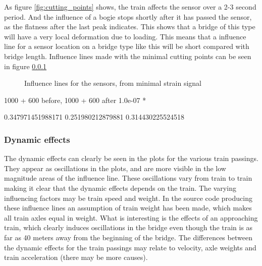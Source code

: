 As figure \ref{fig:cutting_points} shows, the train affects the sensor over a 2-3 second period. And the influence of a bogie stops shortly after it has passed the sensor, as the flatness after the last peak indicates. This shows that a bridge of this type will have a very local deformation due to loading. This means that a influence line for a sensor location on a bridge type like this will be short compared with bridge length. Influence lines made with the minimal cutting points can be seen in figure \ref{}

\begin{figure}[H]
	\begin{adjustbox}{center}
		
	\end{adjustbox}
	\caption{Influence lines for the sensors, from minimal strain signal}
	\label{fig:infl_minimal}
\end{figure}
1000 + 600 before, 1000 + 600 after
1.0e-07 *

0.347971451988171   0.251980212879881   0.314430225524518

\subsubsection{Dynamic effects}
The dynamic effects can clearly be seen in the plots for the various train passings. They appear as oscillations in the plots, and are more visible in the low magnitude areas of the influence line. These oscillations vary from train to train making it clear that the dynamic effects depends on the train. The varying influencing factors may be train speed and weight. In the source code producing these influence lines an assumption of train weight has been made, which makes all train axles equal in weight.
What is interesting is the effects of an approaching train, which clearly induces oscillations in the bridge even though the train is as far as 40 meters away from the beginning of the bridge. The differences between the dynamic effects for the train passings may relate to velocity, axle weights and train acceleration (there may be more causes).

